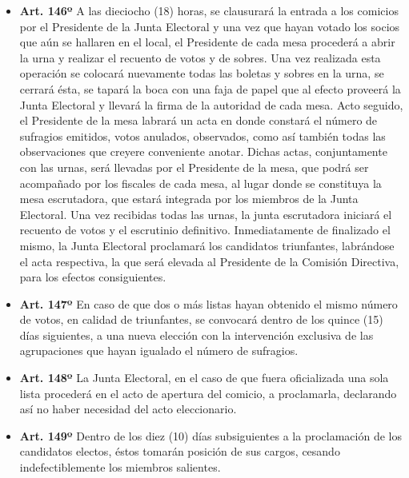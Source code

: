 \documentclass[]{book}
\providecommand{\tightlist}{%
  \setlength{\itemsep}{0pt}\setlength{\parskip}{0pt}}
\begin{document}
\begin{itemize}
\tightlist
\item
  \textbf{Art. 146º}
  A las dieciocho (18) horas, se clausurará la entrada a los comicios por el Presidente de la Junta Electoral y una vez que hayan votado los socios que aún se hallaren en el local, el Presidente de cada mesa procederá a abrir la urna y realizar el recuento de votos y de sobres. Una vez realizada esta operación se colocará nuevamente todas las boletas y sobres en la urna, se cerrará ésta, se tapará la boca con una faja de papel que al efecto proveerá la Junta Electoral y llevará la firma de la autoridad de cada mesa. Acto seguido, el Presidente de la mesa labrará un acta en donde constará el número de sufragios emitidos, votos anulados, observados, como así también todas las observaciones que creyere conveniente anotar. Dichas actas, conjuntamente con las urnas, será llevadas por el Presidente de la mesa, que podrá ser acompañado por los fiscales de cada mesa, al lugar donde se constituya la mesa escrutadora, que estará integrada por los miembros de la Junta Electoral. Una vez recibidas todas las urnas, la junta escrutadora iniciará el recuento de votos y el escrutinio definitivo. Inmediatamente de finalizado el mismo, la Junta Electoral proclamará los candidatos triunfantes, labrándose el acta respectiva, la que será elevada al Presidente de la Comisión Directiva, para los efectos consiguientes.
\end{itemize}

\begin{itemize}
\tightlist
\item
  \textbf{Art. 147º}
  En caso de que dos o más listas hayan obtenido el mismo número de votos, en calidad de triunfantes, se convocará dentro de los quince (15) días siguientes, a una nueva elección con la intervención exclusiva de las agrupaciones que hayan igualado el número de sufragios.
\end{itemize}

\begin{itemize}
\tightlist
\item
  \textbf{Art. 148º}
  La Junta Electoral, en el caso de que fuera oficializada una sola lista procederá en el acto de apertura del comicio, a proclamarla, declarando así no haber necesidad del acto eleccionario.
\end{itemize}

\begin{itemize}
\tightlist
\item
  \textbf{Art. 149º}
  Dentro de los diez (10) días subsiguientes a la proclamación de los candidatos electos, éstos tomarán posición de sus cargos, cesando indefectiblemente los miembros salientes.
\end{itemize}
\end{document}
